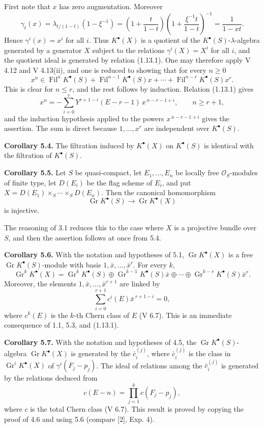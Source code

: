 \documentclass[11pt]{article}
\newcommand{\Fil}{\operatorname{Fil}}
\begin{document}
First note that \(x\) has zero augmentation. Moreover
\[
  \gamma_t(x)
  =\lambda_{t/(1-t)}(1-\xi^{-1})
  =\left(1+\frac{t}{1-t}\right)\left(1+\frac{\xi^{-1}t}{1-t}\right)^{-1}
  =\frac{1}{1-xt}.
\]
Hence \(\gamma^i(x)=x^i\) for all \(i\). Thus \(K^\bullet(X)\) is a quotient of the \(K^\bullet(S)\)-\(\lambda\)-algebra generated by a generator \(X\) subject to the relations \(\gamma^i(X)=X^i\) for all \(i\), and the quotient ideal is generated by relation (1.13.1). One may therefore apply V 4.12 and V 4.13(ii), and one is reduced to showing that for every \(n\geq0\)
\[
  x^n\in \Fil^nK^\bullet(S)+\Fil^{n-1}K^\bullet(S)x+\cdots+\Fil^{n-r}K^\bullet(S)x^r.
\]
This is clear for \(n\leq r\), and the rest follows by induction. Relation (1.13.1) gives
\[
  x^n=-\sum_{i=0}^{r}Y^{r+1-i}(E-r-1)\,x^{\,n-r-1+i},
  \qquad n\geq r+1,
\]
and the induction hypothesis applied to the powers \(x^{\,n-r-1+i}\) gives the assertion. The sum is direct because \(1,\ldots,x^r\) are independent over \(K^\bullet(S)\).

\textbf{Corollary 5.4.} The filtration induced by \(K^\bullet(X)\) on \(K^\bullet(S)\) is identical with the filtration of \(K^\bullet(S)\).

\textbf{Corollary 5.5.} Let \(S\) be quasi-compact, let \(E_1,\ldots,E_n\) be locally free \(\mathcal O_S\)-modules of finite type, let \(D(E_i)\) be the flag scheme of \(E_i\), and put \(X=D(E_1)\times_S\cdots\times_S D(E_n)\). Then the canonical homomorphism
\[
  \operatorname{Gr}K^\bullet(S)\longrightarrow \operatorname{Gr}K^\bullet(X)
\]
is injective.

The reasoning of 3.1 reduces this to the case where \(X\) is a projective bundle over \(S\), and then the assertion follows at once from 5.4.

\textbf{Corollary 5.6.} With the notation and hypotheses of 5.1, \(\operatorname{Gr}K^\bullet(X)\) is a free \(\operatorname{Gr}K^\bullet(S)\)-module with basis \(1,\bar x,\ldots,\bar x^r\). For every \(k\),
\[
  \operatorname{Gr}^kK^\bullet(X)=
  \operatorname{Gr}^kK^\bullet(S)\oplus
  \operatorname{Gr}^{k-1}K^\bullet(S)\bar x\oplus\cdots\oplus
  \operatorname{Gr}^{k-r}K^\bullet(S)\bar x^r.
\]
Moreover, the elements \(1,\bar x,\ldots,\bar x^{r+1}\) are linked by
\[
  \sum_{i=0}^{r+1}c^i(E)\bar x^{\,r+1-i}=0,
\]
where \(c^k(E)\) is the \(k\)-th Chern class of \(E\) (V 6.7). This is an immediate consequence of 1.1, 5.3, and (1.13.1).

\textbf{Corollary 5.7.} With the notation and hypotheses of 4.5, the \(\operatorname{Gr}K^\bullet(S)\)-algebra \(\operatorname{Gr}K^\bullet(X)\) is generated by the \(\bar c_i^{(j)}\), where \(\bar c_i^{(j)}\) is the class in \(\operatorname{Gr}^iK^\bullet(X)\) of \(\gamma^i(F_j-p_j)\). The ideal of relations among the \(\bar c_i^{(j)}\) is generated by the relations deduced from
\[
  c(E-n)=\prod_{j=1}^{k}c(F_j-p_j),
\]
where \(c\) is the total Chern class (V 6.7). This result is proved by copying the proof of 4.6 and using 5.6 (compare [2], Exp. 4).
\end{document}
